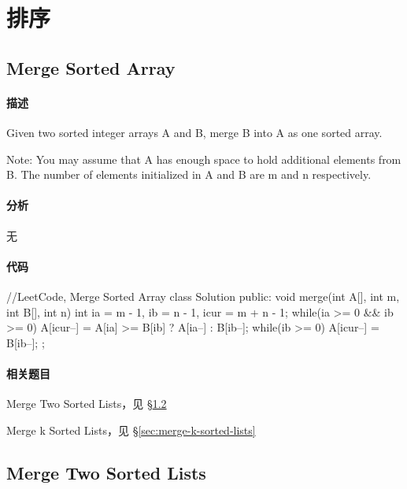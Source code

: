 \chapter{排序}

\section{Merge Sorted Array} %
\label{sec:merge-sorted-array}


\subsubsection{描述}
Given two sorted integer arrays A and B, merge B into A as one sorted array.

Note:
You may assume that A has enough space to hold additional elements from B. The number of elements initialized in A and B are m and n respectively.


\subsubsection{分析}
无


\subsubsection{代码}
\begin{Code}
//LeetCode, Merge Sorted Array
class Solution {
public:
    void merge(int A[], int m, int B[], int n) {
        int ia = m - 1, ib = n - 1, icur = m + n - 1;
        while(ia >= 0 && ib >= 0) {
            A[icur--] = A[ia] >= B[ib] ? A[ia--] : B[ib--];
        }
        while(ib >= 0) {
            A[icur--] = B[ib--];
        }
    }
};
\end{Code}


\subsubsection{相关题目}
\begindot
\item Merge Two Sorted Lists，见 \S \ref{sec:merge-two-sorted-lists}
\item Merge k Sorted Lists，见 \S \ref{sec:merge-k-sorted-lists}
\myenddot


\section{Merge Two Sorted Lists} %
\label{sec:merge-two-sorted-lists}


